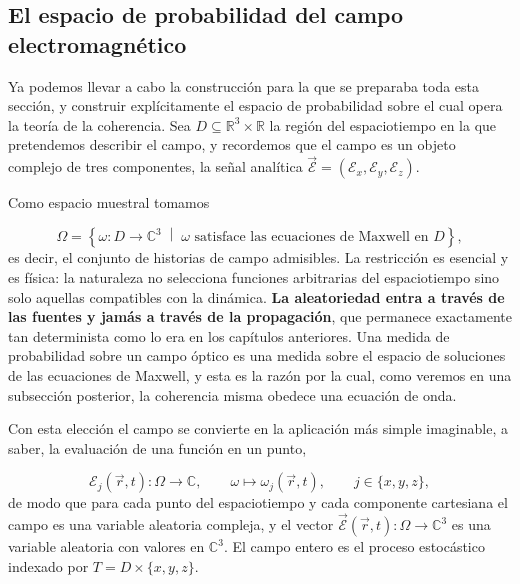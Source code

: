 	\subsection{El espacio de probabilidad del campo electromagnético}

		Ya podemos llevar a cabo la construcción para la que se preparaba toda esta sección, y construir explícitamente el espacio de probabilidad sobre el cual opera la teoría de la coherencia. Sea $D\subseteq\mathbb{R}^{3}\times\mathbb{R}$ la región del espaciotiempo en la que pretendemos describir el campo, y recordemos que el campo es un objeto complejo de tres componentes, la señal analítica $\vec{\mathcal{E}} = (\mathcal{E}_{x},\mathcal{E}_{y},\mathcal{E}_{z})$.

		Como espacio muestral tomamos

		\begin{equation}\label{eq:FieldSampleSpace}
			\Omega = \left\{\omega : D\to\mathbb{C}^{3} \;\middle|\; \omega \text{ satisface las ecuaciones de Maxwell en } D\right\},
		\end{equation}
		es decir, el conjunto de historias de campo admisibles. La restricción es esencial y es física: la naturaleza no selecciona funciones arbitrarias del espaciotiempo sino solo aquellas compatibles con la dinámica. \textbf{La aleatoriedad entra a través de las fuentes y jamás a través de la propagación}, que permanece exactamente tan determinista como lo era en los capítulos anteriores. Una medida de probabilidad sobre un campo óptico es una medida sobre el espacio de soluciones de las ecuaciones de Maxwell, y esta es la razón por la cual, como veremos en una subsección posterior, la coherencia misma obedece una ecuación de onda.

		Con esta elección el campo se convierte en la aplicación más simple imaginable, a saber, la evaluación de una función en un punto,

		\begin{equation}\label{eq:EvaluationMap}
			\mathcal{E}_{j}(\vec{r},t) : \Omega\to\mathbb{C}, \qquad \omega\mapsto\omega_{j}(\vec{r},t),
			\qquad j\in\{x,y,z\},
		\end{equation}
		de modo que para cada punto del espaciotiempo y cada componente cartesiana el campo es una variable aleatoria compleja, y el vector $\vec{\mathcal{E}}(\vec{r},t):\Omega\to\mathbb{C}^{3}$ es una variable aleatoria con valores en $\mathbb{C}^{3}$. El campo entero es el proceso estocástico indexado por $T = D\times\{x,y,z\}$.


